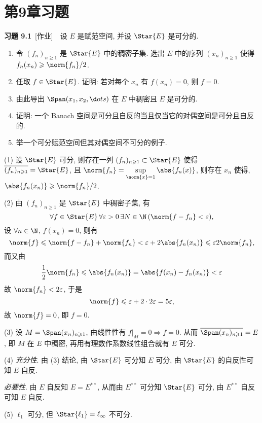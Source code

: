 \section{第9章习题}

	\textbf{习题 9.1}\ [作业]\ \ 设 $ E $ 是赋范空间, 并设 $ \Star{E} $ 是可分的.
	\begin{enumerate}
		\item 令 $ (f_{n})_{n\geqslant1} $ 是 $ \Star{E} $ 中的稠密子集. 选出 $ E $ 中的序列 $ (x_{n})_{n\geqslant1} $ 使得 $ f_{n}(x_{n})\geqslant \norm{f_{n}}/2 $.
		\item 任取 $ f\in\Star{E} $. 证明: 若对每个 $ x_{n} $ 有 $ f(x_{n})=0 $, 则 $ f=0 $. 
		\item 由此导出 $ \Span(x_{1}, x_{2}, \d ots) $ 在 $ E $ 中稠密且 $ E $ 是可分的.
		\item 证明: 一个 Banach 空间是可分且自反的当且仅当它的对偶空间是可分且自反的.
		\item 举一个可分赋范空间但其对偶空间不可分的例子. 
	\end{enumerate}
	\begin{answer}
		(1) 设 $ \Star{E} $ 可分, 则存在一列 $ (f_{n})_{n\geqslant1}\subset\Star{E} $ 使得 $ \overline{(f_{n})_{n\geqslant1}}=\Star{E} $, 且 $ \norm{f_{n}}=\sup\limits_{\norm{x}=1}\abs{f_{n}(x)} $, 则存在 $ x_{n} $ 使得, $ \abs{f_{n}(x_{n})}\geqslant\norm{f_{n}}/2 $.

		(2) 由 $ (f_{n})_{n\geqslant1} $ 是 $ \Star{E} $ 中稠密子集, 有
		\[
			\forall f\in\Star{E}\,\forall \varepsilon>0\,\exists N\in\N\,(\norm{f-f_{n}}<\varepsilon),
		\]
		设 $ \forall n\in\N $, $ f(x_{n})=0 $, 则有
		\[
			\norm{f}\leqslant\norm{f-f_{n}}+\norm{f_{n}}<\varepsilon + 2\abs{f_{n}(x_{n})}\leqslant \varepsilon 2\norm{f_{n}},
		\]
		而又由
		\[
			\frac{1}{2}\norm{f_{n}}\leqslant\abs{f_{n}(x_{n})}=\abs{f(x_{n})-f_{n}(x_{n})}<\varepsilon
		\]
		故 $ \norm{f_{n}}<2\varepsilon $, 于是
		\[
			\norm{f}\leqslant\varepsilon+2\cdot 2\varepsilon=5\varepsilon,
		\]
		故 $ \norm{f}=0 $, 即 $ f=0 $.

		(3) 设 $ M=\Span(x_{n})_{n\geqslant1} $, 由线性性有 $ f|_{M}=0\Rightarrow f=0 $. 从而 $ \overline{\Span(x_{n})_{n\geqslant1}}=E $, 即 $ M $ 在 $ E $ 中稠密, 再用有理数作系数线性组合就有 $ E $ 可分.

		(4) \textsl{充分性}. 由 (3) 结论, 由 $ \Star{E} $ 可分知 $ E $ 可分, 由 $ \Star{E} $ 的自反性可知 $ E $ 自反.

		\textsl{必要性}. 由 $ E $ 自反知 $ E=E^{**} $, 从而由 $ E^{**} $ 可分知 $ \Star{E} $ 可分, 由 $ E^{**} $ 自反可知 $ E $ 自反.

		(5) $ \ell_{1} $ 可分, 但 $ \Star{\ell_{1}}=\ell_{\infty} $ 不可分.\qedhere
	\end{answer}
	
